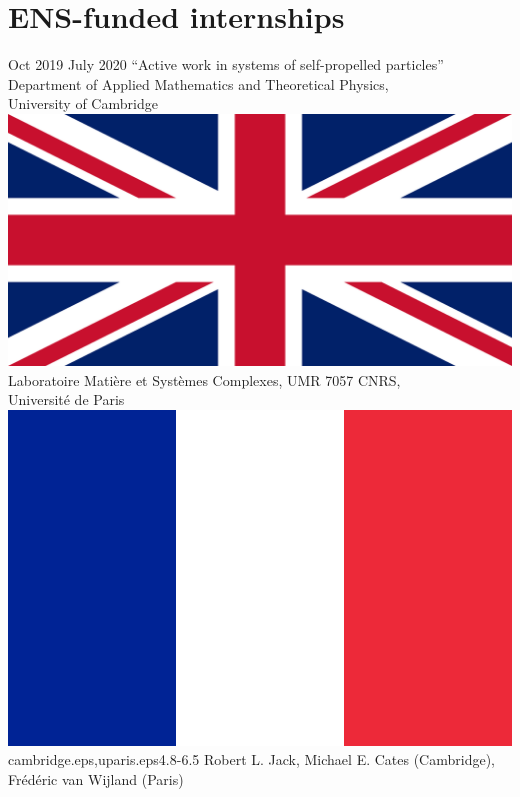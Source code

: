 \documentclass[letterpaper]{cvtemplate_en} %
\begin{document}
\section{ENS-funded internships}

\begin{cvbody}

\cvitem
	{Oct 2019}
	{July 2020}
  {``Active work in systems of self-propelled particles''}
  {Department of Applied Mathematics and Theoretical Physics,\\ University of Cambridge \includegraphics[height=0.8\myheight]{uk}\\
	Laboratoire Mati\`ere et Syst\`emes Complexes, UMR 7057 CNRS,\\ Universit\'e de Paris \includegraphics[height=0.8\myheight]{fr}}
  {cambridge.eps,uparis.eps}{4.8}{-6.5}
	{Robert L. Jack, Michael E. Cates (Cambridge),\\ Fr\'ed\'eric van Wijland (Paris)}
  {\\}


\end{cvbody}
\end{document}
